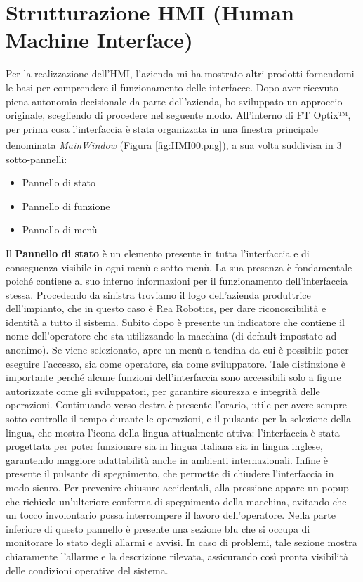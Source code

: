 \section{Strutturazione HMI (Human Machine Interface)}
Per la realizzazione dell'HMI, l'azienda mi ha mostrato altri prodotti fornendomi le basi per comprendere il funzionamento delle interfacce. Dopo aver ricevuto piena autonomia decisionale da parte dell'azienda, ho sviluppato un approccio originale, scegliendo di procedere nel seguente modo. All'interno di FT Optix™, per prima cosa l'interfaccia è stata organizzata in una finestra principale denominata \textit{MainWindow}\textsuperscript{\cite{rockwelloptixmainwindow}} (Figura \ref{fig:HMI00.png}), a sua volta suddivisa in 3 sotto-pannelli:
\begin{itemize}
    \item Pannello di stato
    \item Pannello di funzione
    \item Pannello di menù
\end{itemize}
Il \textbf{Pannello di stato} è un elemento presente in tutta l'interfaccia e di conseguenza visibile in ogni menù e sotto-menù. La sua presenza è fondamentale poiché contiene al suo interno informazioni per il funzionamento dell'interfaccia stessa. Procedendo da sinistra troviamo il logo dell'azienda produttrice dell'impianto, che in questo caso è Rea Robotics, per dare riconoscibilità e identità a tutto il sistema. Subito dopo è presente un indicatore che contiene il nome dell'operatore che sta utilizzando la macchina (di default impostato ad anonimo). Se viene selezionato, apre un menù a tendina da cui è possibile poter eseguire l'accesso, sia come operatore, sia come sviluppatore. Tale distinzione è importante perché alcune funzioni dell'interfaccia sono accessibili solo a figure autorizzate come gli sviluppatori, per garantire sicurezza e integrità delle operazioni. 
Continuando verso destra è presente l'orario, utile per avere sempre sotto controllo il tempo durante le operazioni, e il pulsante per la selezione della lingua, che mostra l'icona della lingua attualmente attiva: l'interfaccia è stata progettata per poter funzionare sia in lingua italiana sia in lingua inglese, garantendo maggiore adattabilità anche in ambienti internazionali. Infine è presente il pulsante di spegnimento, che permette di chiudere l'interfaccia in modo sicuro. Per prevenire chiusure accidentali, alla pressione appare un popup che richiede un'ulteriore conferma di spegnimento della macchina, evitando che un tocco involontario possa interrompere il lavoro dell'operatore.
Nella parte inferiore di questo pannello è presente una sezione blu che si occupa di monitorare lo stato degli allarmi e avvisi. In caso di problemi, tale sezione mostra chiaramente l'allarme e la descrizione rilevata, assicurando così pronta visibilità delle condizioni operative del sistema.

